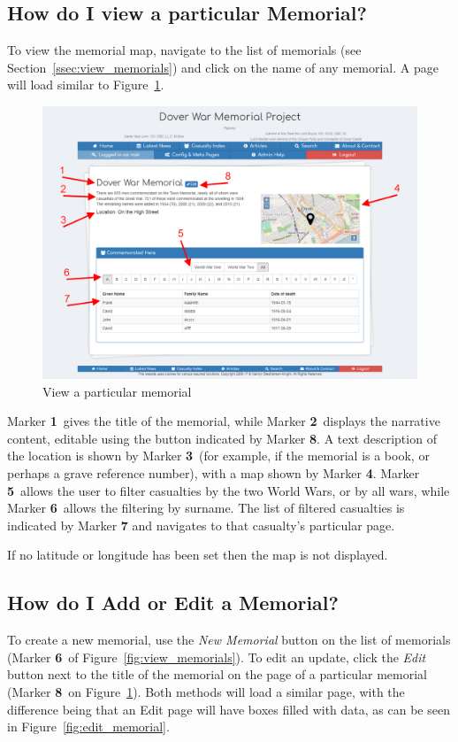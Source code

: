\documentclass[12pt]{article}
\newcommand{\marker}[1]{Marker \color{red}\textbf{#1}\color{black}}
\begin{document}
\newpage
\FloatBarrier
\subsection{How do I view a particular Memorial?}
To view the memorial map, navigate to the list of memorials (see Section~\ref{ssec:view_memorials}) and click on the name of any memorial. A page will load similar to Figure~\ref{fig:view_memorial}.

\begin{figure}[h]
  \centering
 \includegraphics[width=.9\textwidth]{pics/view_memorial.png}
	\caption{View a particular memorial}\label{fig:view_memorial}
\end{figure}

\marker{1}\ gives the title of the memorial, while \marker{2}\ displays the narrative content, editable using the button indicated by \marker{8}. A text description of the location is shown by \marker{3}\ (for example, if the memorial is a book, or perhaps a grave reference number), with a map shown by \marker{4}. \marker{5}\ allows the user to filter casualties by the two World Wars, or by all wars, while \marker{6}\ allows the filtering by surname. The list of filtered casualties is indicated by \marker{7} and navigates to that casualty's particular page.

\begin{infoBox}
If no latitude or longitude has been set then the map is not displayed.
\end{infoBox}

\newpage
\FloatBarrier
\subsection{How do I Add or Edit a Memorial?}\label{ssec:edit_memorial}
To create a new memorial, use the \textit{New Memorial} button on the list of memorials (\marker{6}\ of Figure~\ref{fig:view_memorials}). To edit an update, click the \textit{Edit} button next to the title of the memorial on the page of a particular memorial (\marker{8}\ on Figure~\ref{fig:view_memorial}). Both methods will load a similar page, with the difference being that an Edit page will have boxes filled with data, as can be seen in Figure~\ref{fig:edit_memorial}.
\end{document}
